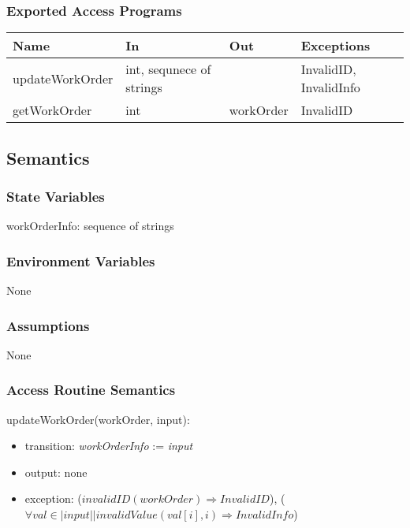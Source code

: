 \documentclass[12pt, titlepage]{article}
\begin{document}
\subsubsection{Exported Access Programs}

\begin{center}
\begin{tabular}{p{4cm} p{5cm} p{2cm} p{2cm}}
\hline
\textbf{Name} & \textbf{In} & \textbf{Out} & \textbf{Exceptions} \\
\hline
updateWorkOrder & int, sequnece of strings &  & InvalidID, InvalidInfo \\
getWorkOrder & int & workOrder & InvalidID \\
\hline
\end{tabular}
\end{center}

\subsection{Semantics}

\subsubsection{State Variables}

workOrderInfo: sequence of strings

\subsubsection{Environment Variables}

None

\subsubsection{Assumptions}

None

\subsubsection{Access Routine Semantics}

\noindent updateWorkOrder(workOrder, input):
\begin{itemize}
\item transition: \textit{workOrderInfo} := \textit{input}
\item output: none
\item exception: ($invalidID(workOrder) \Rightarrow InvalidID$), ($\forall val \in |input| | invalidValue(val[i], i) \Rightarrow InvalidInfo$)
\end{itemize}
\end{document}
